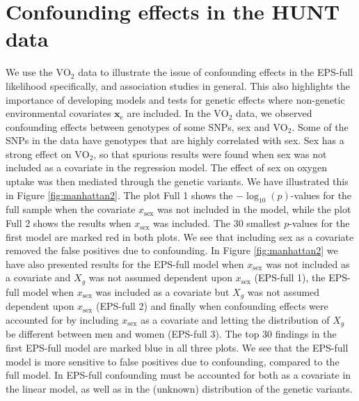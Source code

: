 \documentclass[10pt,a4paper]{article}
\def\bxe{\mathbf{x}_{\text{e}}}
\begin{document}
\section{Confounding effects in the HUNT data}
We use the $\text{VO}_2$ data to illustrate the issue of confounding effects in the EPS-full likelihood specifically, and association studies in general. This also highlights the importance of developing models and tests for genetic effects where non-genetic environmental covariates $\bxe$ are included. In the $\text{VO}_2$ data, we observed confounding effects between genotypes of some SNPs, sex and $\text{VO}_2$. Some of the SNPs in the data have genotypes that are highly correlated with sex. Sex has a strong effect on $\text{VO}_2$, so that spurious results were found when sex was not included as a covariate in the regression model. The effect of sex on oxygen uptake was then mediated through the genetic variants. We have illustrated this in Figure \ref{fig:manhattan2}. The plot Full 1 shows the $-\log_{10}(p)$-values for the full sample when the covariate $x_{\text{sex}}$ was not included in the model, while the plot Full 2 shows the results when $x_{\text{sex}}$ was included. The 30 smallest $p$-values for the first model are marked red in both plots. We see that including sex as a covariate removed the false positives due to confounding. In Figure \ref{fig:manhattan2} we have also presented results for the EPS-full model when $x_{\text{sex}}$ was not included as a covariate and $X_g$ was not assumed dependent upon $x_{\text{sex}}$ (EPS-full 1), the EPS-full model when $x_{\text{sex}}$ was included as a covariate but $X_g$ was not assumed dependent upon $x_{\text{sex}}$ (EPS-full 2) and finally when confounding effects were accounted for by including $x_{\text{sex}}$ as a covariate and letting the distribution of $X_g$ be different between men and women (EPS-full 3). The top 30 findings in the first EPS-full model are marked blue in all three plots. We see that the EPS-full model is more sensitive to false positives due to confounding, compared to the full model. In EPS-full confounding must be accounted for both as a covariate in the linear model, as well as in the (unknown) distribution of the genetic variants.
\end{document}
